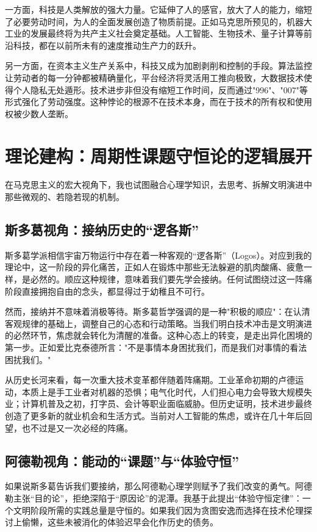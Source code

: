 \documentclass[a4paper,12pt]{ctexart}
\begin{document}
一方面，科技是人类解放的强大力量。它延伸了人的感官，放大了人的能力，缩短了必要劳动时间，为人的全面发展创造了物质前提。正如马克思所预见的，机器大工业的发展最终将为共产主义社会奠定基础。人工智能、生物技术、量子计算等前沿科技，都在以前所未有的速度推动生产力的跃升。

另一方面，在资本主义生产关系中，科技又成为加剧剥削和控制的手段。算法监控让劳动者的每一分钟都被精确量化，平台经济将灵活用工推向极致，大数据技术使得个人隐私无处遁形。技术进步非但没有缩短工作时间，反而通过"996"、"007"等形式强化了劳动强度。这种悖论的根源不在技术本身，而在于技术的所有权和使用权被少数人垄断。

\section{理论建构：周期性课题守恒论的逻辑展开}

在马克思主义的宏大视角下，我也试图融合心理学知识，去思考、拆解文明演进中那些微观的、若隐若现的机制。

\subsection{斯多葛视角：接纳历史的“逻各斯”}
斯多葛学派相信宇宙万物运行中存在着一种客观的“逻各斯”（Logos）。对应到我的理论中，这一阶段的异化痛苦，正如人在锻炼中那些无法躲避的肌肉酸痛、疲惫一样，是必然的。顺应这种规律，意味着我们要先学会接纳。任何试图绕过这一阵痛阶段直接拥抱自由的念头，都显得过于幼稚且不可行。

然而，接纳并不意味着消极等待。斯多葛哲学强调的是一种"积极的顺应"：在认清客观规律的基础上，调整自己的心态和行动策略。当我们明白技术冲击是文明演进的必然环节，焦虑就会转化为清醒的准备。这种心态上的转变，是走出异化困境的第一步。正如爱比克泰德所言："不是事情本身困扰我们，而是我们对事情的看法困扰我们。"

从历史长河来看，每一次重大技术变革都伴随着阵痛期。工业革命初期的卢德运动，本质上是手工业者对机器的恐惧；电气化时代，人们担心电力会导致大规模失业；计算机普及之初，打字员、会计等职业面临威胁。但历史证明，技术进步最终创造了更多新的就业机会和生活方式。当前对人工智能的焦虑，或许在几十年后回望，也不过是又一次必经的阵痛。

\subsection{阿德勒视角：能动的“课题”与“体验守恒”}
如果说斯多葛告诉我们要接纳，那么阿德勒心理学则赋予了我们改变的勇气。阿德勒主张“目的论”，拒绝深陷于“原因论”的泥潭。我基于此提出“体验守恒定律”：一个文明阶段所需的实践总量是守恒的。如果我们因为贪图安逸而选择在技术伦理探讨上偷懒，这些未被消化的体验迟早会化作历史的债务。
\end{document}
